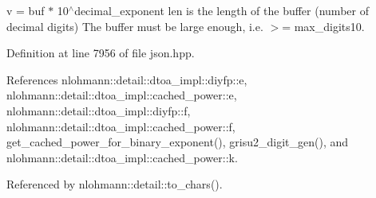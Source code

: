 v = buf $\ast$ 10$^\wedge$decimal\+\_\+exponent len is the length of the buffer (number of decimal digits) The buffer must be large enough, i.\+e. $>$= max\+\_\+digits10. 

Definition at line 7956 of file json.\+hpp.



References nlohmann\+::detail\+::dtoa\+\_\+impl\+::diyfp\+::e, nlohmann\+::detail\+::dtoa\+\_\+impl\+::cached\+\_\+power\+::e, nlohmann\+::detail\+::dtoa\+\_\+impl\+::diyfp\+::f, nlohmann\+::detail\+::dtoa\+\_\+impl\+::cached\+\_\+power\+::f, get\+\_\+cached\+\_\+power\+\_\+for\+\_\+binary\+\_\+exponent(), grisu2\+\_\+digit\+\_\+gen(), and nlohmann\+::detail\+::dtoa\+\_\+impl\+::cached\+\_\+power\+::k.



Referenced by nlohmann\+::detail\+::to\+\_\+chars().


